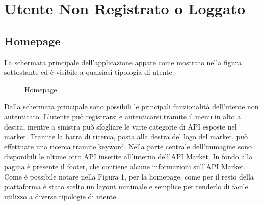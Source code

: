 \newpage
\section{Utente Non Registrato o Loggato}

	\subsection{Homepage}
		La schermata principale dell'applicazione appare come mostrato nella figura sottostante ed è visibile a qualsiasi tipologia di utente.
		
		\label{Homepage}
		\begin{figure}[H]
			\centering
			\caption{Homepage}
		\end{figure}
		
		Dalla schermata principale sono possibili le principali funzionalità dell'utente non autenticato. L'utente può registrarsi e autenticarsi tramite il menu in alto a destra, mentre a sinistra può sfogliare le varie categorie di API esposte nel market. Tramite la barra di ricerca, posta alla destra del logo del market, può effettuare una ricerca tramite keyword. Nella parte centrale dell'immagine sono disponibili le ultime otto API inserite all'interno dell'API Market.
		In fondo alla pagina è presente il footer, che contiene alcune informazioni sull'API Market.
		Come è possibile notare nella Figura 1, per la homepage, come per il resto della piattaforma è stato scelto un layout minimale e semplice per renderlo di facile utilizzo a diverse tipologie di utente.

